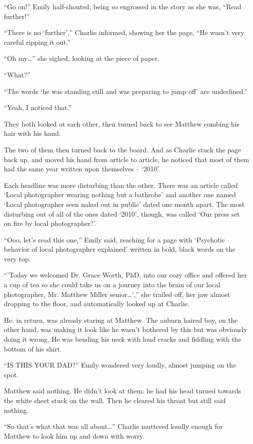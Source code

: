 “Go on!” Emily half-shouted, being so engrossed in the story as she was, “Read further!”

“There is no ‘further',” Charlie informed, showing her the page, “He wasn't very careful ripping it out.”

“Oh my…” she sighed, looking at the piece of paper.

“What?”

“The words ‘he was standing still and was preparing to jump off' are underlined.”

“Yeah, I noticed that.”

They both looked at each other, then turned back to see Matthew combing his hair with his hand. 

The two of them then turned back to the board. And as Charlie stuck the page back up, and moved his hand from article to article, he noticed that most of them had the same year written upon themselves – ‘2010'.

Each headline was more disturbing than the other. There was an article called ‘Local photographer wearing nothing but a bathrobe' and another one named ‘Local photographer seen naked out in public' dated one month apart. The most disturbing out of all of the ones dated ‘2010', though, was called ‘Our press set on fire by local photographer?'.

“Ooo, let's read this one,” Emily said, reaching for a page with ‘Psychotic behavior of local photographer explained' written in bold, black words on the very top.

“'Today we welcomed Dr. Grace Worth, PhD, into our cozy office and offered her a cup of tea so she could take us on a journey into the brain of our local photographer, Mr. Matthew Miller senior…',” she trailed off, her jaw almost dropping to the floor, and automatically looked up at Charlie.

He, in return, was already staring at Matthew. The auburn haired boy, on the other hand, was making it look like he wasn't bothered by this but was obviously doing it wrong. He was bending his neck with loud cracks and fiddling with the bottom of his shirt.

“IS THIS YOUR DAD?” Emily wondered very loudly, almost jumping on the spot.

Matthew said nothing. He didn't look at them: he had his head turned towards the white sheet stuck on the wall. Then he cleared his throat but still said nothing.

“So that's what that was all about…” Charlie muttered loudly enough for Matthew to look him up and down with worry.

